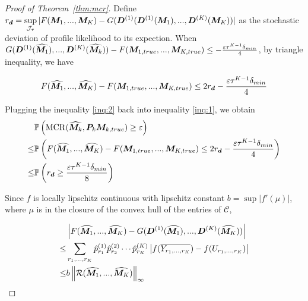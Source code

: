 \documentclass{article}
\DeclareMathOperator*{\mcr}{MCR}
\begin{document}
\begin{appendices}
\begin{proof}[Proof of Theorem~\ref{thm:mcr}]
Define $r_{\bm{d}}=\displaystyle\sup_{\mathcal{J}_\tau} |F(\boldsymbol{M}_1,...,\boldsymbol{M}_K)-G(\boldsymbol{D}^{(1)}(\boldsymbol{D}^{(1)}(\boldsymbol{M}_1),...,\boldsymbol{D}^{(K)}(\boldsymbol{M}_K))|$ as the stochastic deviation of profile likelihood to its expection. When $G(\boldsymbol{D}^{(1)}(\widehat{\boldsymbol{M}_1}),...,\boldsymbol{D}^{(K)}(\widehat{\boldsymbol{M}_k}))-F(\boldsymbol{M}_{1,true},...,\boldsymbol{M}_{K,true})\leq -\frac{\varepsilon\tau^{K-1}\delta_{min}}{4}$, by triangle inequality, we have

\begin{equation} \label{inq:2}
    F(\widehat{\boldsymbol{M}_1},...,\widehat{\boldsymbol{M}_K})-F(\boldsymbol{M}_{1,true},...,\boldsymbol{M}_{K,true})\leq2r_{\bm{d}}-\frac{\varepsilon\tau^{K-1}\delta_{min}}{4}
\end{equation}

Plugging the inequality \eqref{inq:2} back into inequality \eqref{inq:1}, we obtain
\begin{equation}\label{inq:3}
\begin{split}
    &\mathbb{P}\left(\mcr(\widehat{\mM_k}, \mP_k\mM_{k,true})\geq \varepsilon\right)\\
    \leq & \mathbb{P}\left(F(\widehat{\mM_1},...,\widehat{\mM_K})-F(\mM_{1,true},...,\mM_{K,true})\leq 2r_{\md}-\frac{\varepsilon\tau^{K-1}\delta_{min}}{4}\right)\\
    \leq& \mathbb{P}\left(r_{\md}\geq\frac{\varepsilon\tau^{K-1}\delta_{min}}{8}\right)
\end{split}
\end{equation}

Since $f$ is locally lipschitz continuous with lipschitz constant $b = \sup|f'(\mu)|$, where $\mu$ is in the closure of the convex hull of the entries of $\mathcal{C}$, 

\begin{equation}\label{inq:4}
\begin{split}
&\left|F(\widehat{\boldsymbol{M}_1},...,\widehat{\boldsymbol{M}_K})-G(\boldsymbol{D}^{(1)}(\widehat{\boldsymbol{M}_1}),...,\boldsymbol{D}^{(K)}(\widehat{\boldsymbol{M}_K}))\right|\\
\leq&\sum_{r_1,...,r_K}\hat{p}_{r_1}^{(1)}\hat{p}_{r_2}^{(2)}\cdots\hat{p}_{r_K}^{(K)}\left|f(\overline{Y_{r_1,...,r_K}})-f(U_{r_1,...,r_K})\right|\\
\leq& b\left\|\mathcal{R}(\widehat{\boldsymbol{M}_1},...,\widehat{\boldsymbol{M}_K})\right\|_\infty
\end{split}
\end{equation}


\end{proof}
\end{appendices}
\end{document}
